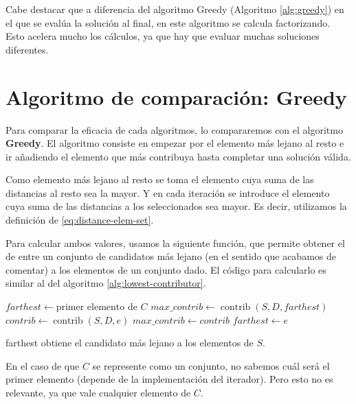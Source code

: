 \documentclass{article}
\begin{document}
Cabe destacar que a diferencia del algoritmo Greedy (Algoritmo \ref{alg:greedy}) en el que se evalúa la solución al final,
en este algoritmo se calcula factorizando. Esto acelera mucho los cálculos, ya que hay que evaluar muchas soluciones diferentes.

\pagebreak

\section{Algoritmo de comparación: Greedy}

Para comparar la eficacia de cada algoritmos, lo compararemos con el algoritmo \textbf{Greedy}. El algoritmo consiste en empezar por el
 elemento más lejano al resto e ir añadiendo el elemento que más contribuya hasta completar una solución válida.

Como elemento más lejano al resto se toma el elemento cuya suma de las distancias al resto sea la mayor. Y en cada iteración se introduce el elemento
cuya suma de las distancias a los seleccionados sea mayor. Es decir, utilizamos la definición de \eqref{eq:distance-elem-set}.

Para calcular ambos valores, usamos la siguiente función, que permite obtener el de entre
un conjunto de candidatos más lejano (en el sentido que acabamos de comentar) a los elementos de un conjunto dado.
El código para calcularlo es similar al del algoritmo \ref{alg:lowest-contributor}.

 \begin{algorithm}[H]
	\DontPrintSemicolon %
	$farthest \gets \text{primer elemento de } C$\;
	$max\_contrib \gets \operatorname{contrib}(S,D,farthest)$\;
	 {
		$contrib \gets \operatorname{contrib}(S,D,e)$\;
		 { 
			$max\_contrib \gets contrib$\;
			$farthest \gets e$ 
		}
	}
	\;
	\caption{{\sc farthest} obtiene el candidato más lejano a los elementos de $S$.}
	\label{alg:farthest-candidate-set}
\end{algorithm}

En el caso de que $C$ se represente como un conjunto, no sabemos cuál será el primer elemento (depende de la implementación del iterador). Pero
esto no es relevante, ya que vale cualquier elemento de $C$.
\end{document}
